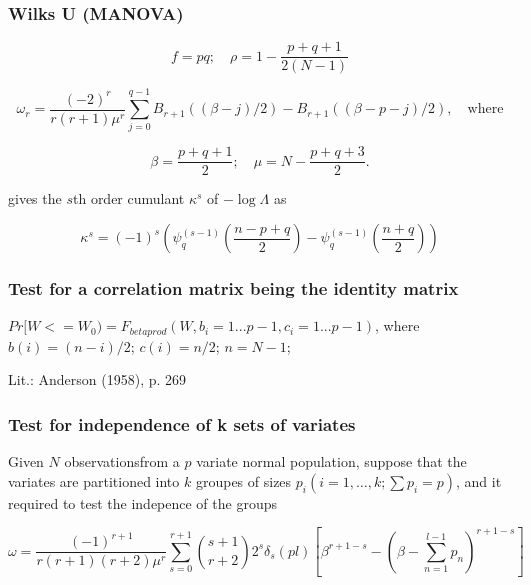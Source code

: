 \subsubsection{Wilks U (MANOVA)}
\label{Box Expansion for Wilks U}

\begin{equation}
	f=pq; \quad \rho=1-\frac{p+q+1}{2(N-1)}
\end{equation}

\begin{equation}
	\omega_r = \frac{(-2)^r}{r(r+1) \mu^r} \sum_{j=0}^{q-1}{B_{r+1}((\beta -j)/2) - B_{r+1}((\beta -p-j)/2)}, \quad \text{where}
\end{equation}

\begin{equation}
	\beta=\frac{p+q+1}{2}; \quad \mu=N-\frac{p+q+3}{2}.
\end{equation}

\cite{Wakaki_2006} gives the $s$th order cumulant $\kappa^{s}$ of $-\log \Lambda$ as

\begin{equation}
	\kappa^{s} = \left(-1\right)^s \left(\psi_q^{(s-1)} \left(\frac{n-p+q}{2}\right)  -  \psi_q^{(s-1)} \left(\frac{n+q}{2}\right)   \right)  
\end{equation}






\subsubsection{Test for a correlation matrix being the identity matrix}

$Pr[W<=W_0)=F_{betaprod}(W,b_i=1...p-1,c_i=1...p-1)$,
where $b(i)=(n-i)/2$;   $c(i)=n/2$;  $n=N-1$;

Lit.:	Anderson (1958), p. 269




\subsubsection{Test for independence of k sets of variates}
Given $N$ observationsfrom a $p$ variate normal population, suppose that the variates are partitioned into $k$ groupes of sizes $p_i (i=1,\ldots,k; \sum p_i = p)$, and it required to test the indepence of the groups

\begin{equation}
	\omega = \frac{(-1)^{r+1}}{r(r+1)(r+2) \mu^r} \sum_{s=0}^{r+1} \binom{s+1}{r+2} 2^s \delta_s(pl) \left[\beta^{r+1-s} - \left(\beta - \sum_{n=1}^{l-1} p_n\right)^{r+1-s}  \right]
\end{equation}

